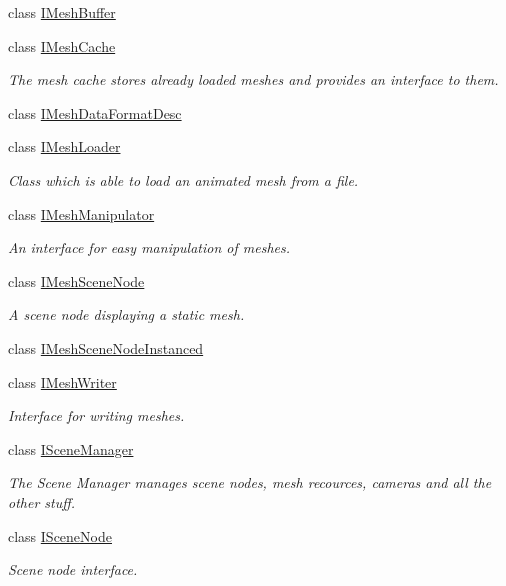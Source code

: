 \begin{DoxyCompactItemize}
class \hyperlink{classirr_1_1scene_1_1IMeshBuffer}{I\+Mesh\+Buffer}
\item 
class \hyperlink{classirr_1_1scene_1_1IMeshCache}{I\+Mesh\+Cache}
\begin{DoxyCompactList}\small\item\em The mesh cache stores already loaded meshes and provides an interface to them. \end{DoxyCompactList}\item 
class \hyperlink{classirr_1_1scene_1_1IMeshDataFormatDesc}{I\+Mesh\+Data\+Format\+Desc}
\item 
class \hyperlink{classirr_1_1scene_1_1IMeshLoader}{I\+Mesh\+Loader}
\begin{DoxyCompactList}\small\item\em Class which is able to load an animated mesh from a file. \end{DoxyCompactList}\item 
class \hyperlink{classirr_1_1scene_1_1IMeshManipulator}{I\+Mesh\+Manipulator}
\begin{DoxyCompactList}\small\item\em An interface for easy manipulation of meshes. \end{DoxyCompactList}\item 
class \hyperlink{classirr_1_1scene_1_1IMeshSceneNode}{I\+Mesh\+Scene\+Node}
\begin{DoxyCompactList}\small\item\em A scene node displaying a static mesh. \end{DoxyCompactList}\item 
class \hyperlink{classirr_1_1scene_1_1IMeshSceneNodeInstanced}{I\+Mesh\+Scene\+Node\+Instanced}
\item 
class \hyperlink{classirr_1_1scene_1_1IMeshWriter}{I\+Mesh\+Writer}
\begin{DoxyCompactList}\small\item\em Interface for writing meshes. \end{DoxyCompactList}\item 
class \hyperlink{classirr_1_1scene_1_1ISceneManager}{I\+Scene\+Manager}
\begin{DoxyCompactList}\small\item\em The Scene Manager manages scene nodes, mesh recources, cameras and all the other stuff. \end{DoxyCompactList}\item 
class \hyperlink{classirr_1_1scene_1_1ISceneNode}{I\+Scene\+Node}
\begin{DoxyCompactList}\small\item\em Scene node interface. \end{DoxyCompactList}\item 

\end{DoxyCompactItemize}
